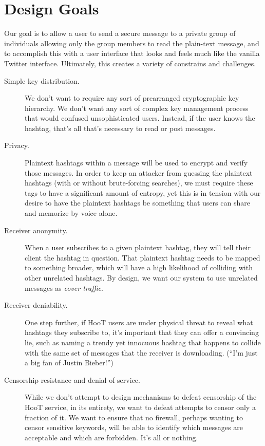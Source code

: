 \section{Design Goals}

Our goal is to allow a user to send a secure message to a private group of individuals allowing only the group members to read the plain-text message, and to accomplish this with a user interface that looks and feels much like the vanilla Twitter interface. Ultimately, this creates a variety of constrains and challenges.

\begin{description}
\item[Simple key distribution.] We don't want to require any sort of prearranged cryptographic key hierarchy. We don't want any sort of complex key management process that would confused unsophisticated users.  Instead, if the user knows the hashtag, that's all that's necessary to read or post messages.

\item[Privacy.] Plaintext hashtags within a message will be used to encrypt and verify those messages.  In order to keep an attacker from guessing the plaintext hashtags (with or without brute-forcing searches), we must require these tags to have a significant amount of entropy, yet this is in tension with our desire to have the plaintext hashtags be something that users can share and memorize by voice alone.

\item[Receiver anonymity.]  When a user subscribes to a given plaintext hashtag, they will tell their client the hashtag in question. That plaintext hashtag needs to be mapped to something broader, which will have a high likelihood of colliding with other unrelated hashtags. By design, we want our system to use unrelated messages as {\em cover traffic}.

\item[Receiver deniability.] One step further, if HooT users are under physical threat to reveal what hashtags they subscribe to, it's important that they can offer a convincing lie, such as naming a trendy yet innocuous hashtag that happens to collide with the same set of messages that the receiver is downloading. (``I'm just a big fan of Justin Bieber!'')

\item[Censorship resistance and denial of service.] While we don't attempt to design mechanisms to defeat censorship of the HooT service, in its entirety, we want to defeat attempts to censor only a fraction of it. We want to ensure that no firewall, perhaps wanting to censor sensitive keywords, will be able to identify which messages are acceptable and which are forbidden. It's all or nothing. %


\end{description}
